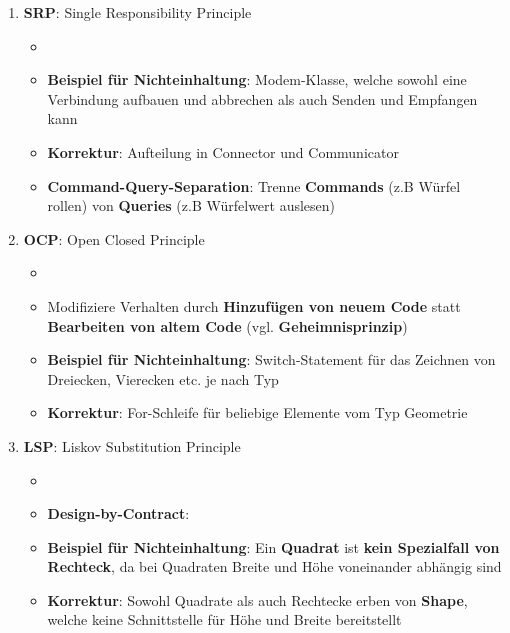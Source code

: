 \begin{enumerate}
	\item \textbf{SRP}: Single Responsibility Principle
	\begin{itemize}
		\item {}
		\item \textbf{Beispiel für Nichteinhaltung}: Modem-Klasse, welche sowohl eine Verbindung aufbauen und abbrechen als auch Senden und Empfangen kann
		\item \textbf{Korrektur}: Aufteilung in Connector und Communicator
		\item \textbf{Command-Query-Separation}: Trenne \textbf{Commands} (z.B Würfel rollen) von \textbf{Queries} (z.B Würfelwert auslesen)
	\end{itemize}
	\item \textbf{OCP}: Open Closed Principle
	\begin{itemize}
		\item {}
		\item Modifiziere Verhalten durch \textbf{Hinzufügen von neuem Code} statt \textbf{Bearbeiten von altem Code} (vgl. \textbf{Geheimnisprinzip})
		\item \textbf{Beispiel für Nichteinhaltung}: Switch-Statement für das Zeichnen von Dreiecken, Vierecken etc. je nach Typ
		\item \textbf{Korrektur}: For-Schleife für beliebige Elemente vom Typ Geometrie
	\end{itemize}
	\item \textbf{LSP}: Liskov Substitution Principle
	\begin{itemize}
		\item {}
		\item \textbf{Design-by-Contract}: 
		\item \textbf{Beispiel für Nichteinhaltung}: Ein \textbf{Quadrat} ist \textbf{kein Spezialfall von Rechteck}, da bei Quadraten Breite und Höhe voneinander abhängig sind
		\item \textbf{Korrektur}: Sowohl Quadrate als auch Rechtecke erben von \textbf{Shape}, welche keine Schnittstelle für Höhe und Breite bereitstellt

\end{itemize}
\end{enumerate}
